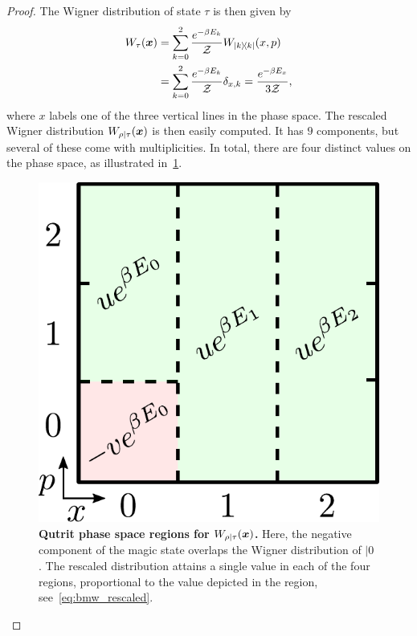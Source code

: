 \documentclass[pra,
aps,
twocolumn,
superscriptaddress,
groupedaddress,
nofootinbib,
reprint
]{revtex4-1}
\begin{document}
\begin{proof}
The Wigner distribution of state $\tau$ is then given by
\begin{align}
	\W[\bmx]{\tau} &= \sum\limits_{k=0}^2 \frac{e^{-\beta E_k}}{\Z}W_{\ketbra{k}}(x, p) \nonumber\\
	&= \sum\limits_{k=0}^2 \frac{e^{-\beta E_k}}{\Z} \delta_{x, k} = \frac{e^{-\beta E_x}}{3\Z},
\end{align}
where $x$ labels one of the three vertical lines in the phase space.
The rescaled Wigner distribution $W_{\rho|\tau}(\boldsymbol{x})$ is then easily computed. It has $9$ components, but several of these come with multiplicities. In total, there are four distinct values on the phase space, as illustrated in~\cref{fig:pd_split}.
\begin{figure}[h]
    \centering
    \includegraphics[scale=0.45]{figs/pd_split_thermal.pdf}
    \caption{\textbf{Qutrit phase space regions for $W_{\rho | \tau}(\boldsymbol{x})$.}
    Here, the negative component of the magic state overlaps the Wigner distribution of $|0\>$. The rescaled distribution attains a single value in each of the four regions, proportional to the value depicted in the region, see~\cref{eq:bmw_rescaled}.
    }
    \label{fig:pd_split}
\end{figure}


\end{proof}
\end{document}
